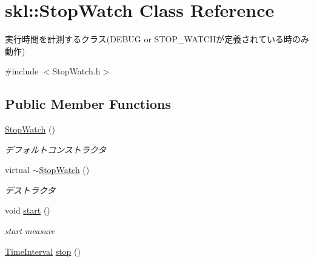 \hypertarget{classskl_1_1_stop_watch}{}\section{skl\+:\+:Stop\+Watch Class Reference}
\label{classskl_1_1_stop_watch}


実行時間を計測するクラス(D\+E\+B\+UG or S\+T\+O\+P\+\_\+\+W\+A\+T\+C\+Hが定義されている時のみ動作)  




{\ttfamily \#include $<$Stop\+Watch.\+h$>$}

\subsection*{Public Member Functions}
\begin{DoxyCompactItemize}
\item 
\hypertarget{classskl_1_1_stop_watch_ad715945060eeb23baa3c036ad19b1edb}{}\label{classskl_1_1_stop_watch_ad715945060eeb23baa3c036ad19b1edb} 
\hyperlink{classskl_1_1_stop_watch_ad715945060eeb23baa3c036ad19b1edb}{Stop\+Watch} ()
\begin{DoxyCompactList}\small\item\em デフォルトコンストラクタ \end{DoxyCompactList}\item 
\hypertarget{classskl_1_1_stop_watch_a223ec0da71dd0bc4f2b14d1af44bf20a}{}\label{classskl_1_1_stop_watch_a223ec0da71dd0bc4f2b14d1af44bf20a} 
virtual \hyperlink{classskl_1_1_stop_watch_a223ec0da71dd0bc4f2b14d1af44bf20a}{$\sim$\+Stop\+Watch} ()
\begin{DoxyCompactList}\small\item\em デストラクタ \end{DoxyCompactList}\item 
\hypertarget{classskl_1_1_stop_watch_a09a3c8f9ab03d7b28e4f8b90a833974e}{}\label{classskl_1_1_stop_watch_a09a3c8f9ab03d7b28e4f8b90a833974e} 
void \hyperlink{classskl_1_1_stop_watch_a09a3c8f9ab03d7b28e4f8b90a833974e}{start} ()
\begin{DoxyCompactList}\small\item\em start measure \end{DoxyCompactList}\item 
\hypertarget{classskl_1_1_stop_watch_a9f944c617ed495f2d77e3edee204e29b}{}\label{classskl_1_1_stop_watch_a9f944c617ed495f2d77e3edee204e29b} 
\hyperlink{classskl_1_1_time_interval}{Time\+Interval} \hyperlink{classskl_1_1_stop_watch_a9f944c617ed495f2d77e3edee204e29b}{stop} ()

\end{DoxyCompactItemize}
